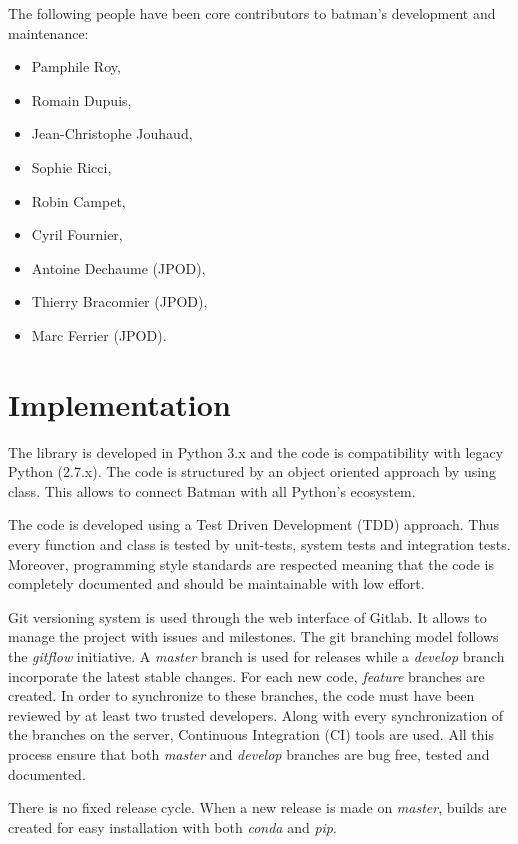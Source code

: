 The following people have been core contributors to batman's development and maintenance:

\begin{itemize}
\item Pamphile Roy,
\item Romain Dupuis,
\item Jean-Christophe Jouhaud,
\item Sophie Ricci,
\item Robin Campet,
\item Cyril Fournier,
\item Antoine Dechaume (JPOD),
\item Thierry Braconnier (JPOD),
\item Marc Ferrier (JPOD).
\end{itemize}

\section{Implementation}

The library is developed in Python 3.x and the code is compatibility with legacy Python (2.7.x). The code is structured by an object oriented approach by using class. This allows to connect Batman with all Python's ecosystem.

The code is developed using a Test Driven Development (TDD) approach. Thus every function and class is tested by unit-tests, system tests and integration tests. Moreover, programming style standards are respected meaning that the code is completely documented and should be maintainable with low effort.

Git versioning system is used through the web interface of Gitlab. It allows to manage the project with issues and milestones. The git branching model follows the \emph{gitflow} initiative. A \emph{master} branch is used for releases while a \emph{develop} branch incorporate the latest stable changes. For each new code, \emph{feature} branches are created. In order to synchronize to these branches, the code must have been reviewed by at least two trusted developers. Along with every synchronization of the branches on the server, Continuous Integration (CI) tools are used. All this process ensure that both \emph{master} and \emph{develop} branches are bug free, tested and documented.

There is no fixed release cycle. When a new release is made on \emph{master}, builds are created for easy installation with both \emph{conda} and \emph{pip}.

